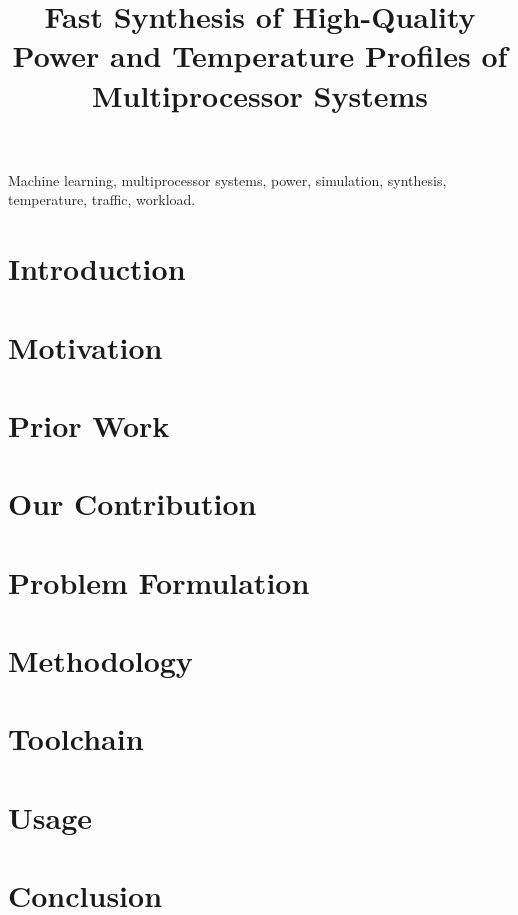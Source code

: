 \documentclass[conference]{IEEEtran}
\title{
  Fast Synthesis of High-Quality Power and Temperature Profiles of
  Multiprocessor Systems
}
\author{}
\begin{document}
  \maketitle
  \thispagestyle{plain}
  \pagestyle{plain}

  \begin{abstract}
    
  \end{abstract}

  \begin{IEEEkeywords}
    Machine learning,
    multiprocessor systems,
    power,
    simulation,
    synthesis,
    temperature,
    traffic,
    workload.
  \end{IEEEkeywords}


  \section{Introduction} 
  

  \section{Motivation} 
  

  \section{Prior Work}

  \section{Our Contribution} 
  
  

  \section{Problem Formulation} 
  

  \section{Methodology} 
  

  \section{Toolchain} 
  

  \section{Usage} 
  

  \section{Conclusion} 
  

  \begingroup
    
    
  \endgroup
\end{document}

